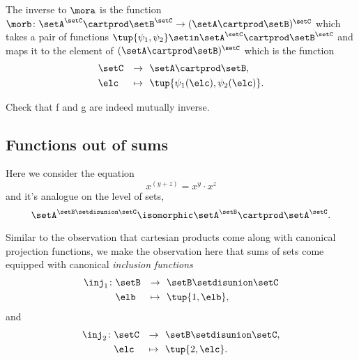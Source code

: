 The inverse to $\mora$ is the function $\morb \colon  \setA^\setC \cartprod \setB^\setC  \to (\setA \cartprod \setB)^{\setC}$ which takes a pair of functions $\tup{\psi_1, \psi _2} \setin \setA^\setC \cartprod \setB^\setC$ and maps it to the element of $(\setA \cartprod \setB)^{\setC}$ which is the function 
\begin{equation}
\begin{aligned}
   & \setC   & \to & \ \ \setA \cartprod \setB, \\
         & \elc & \mapsto & \ \ \tup{\psi_1(\elc), \psi_2(\elc)}.
\end{aligned}
\end{equation}

\begin{gradedexercise}
Check that f and g are indeed mutually inverse. 
\end{gradedexercise}


\subsection{Functions out of sums}

Here we consider the equation
\begin{equation}
x^{(y + z)}           = x^y \cdot x^z
\end{equation}
and it's analogue on the level of sets, 
\begin{equation}
\setA^{\setB \setdisunion \setC}           \isomorphic \setA^\setB \cartprod \setA^\setC.
\end{equation}

Similar to the observation that cartesian products come along with canonical projection functions, we make the  observation here that sums of sets come equipped with canonical \emph{inclusion functions}
\begin{equation}
\begin{aligned}
    \inj_1 \colon   & \setB  & \to & \ \ \setB \setdisunion \setC \\
         & \elb & \mapsto & \ \  \tup{1, \elb},
\end{aligned}
\end{equation}
and
\begin{equation}
\begin{aligned}
    \inj_2 \colon   & \setC & \to & \ \ \setB \setdisunion \setC, \\
         & \elc & \mapsto & \ \  \tup{2, \elc}.
\end{aligned}
\end{equation}

